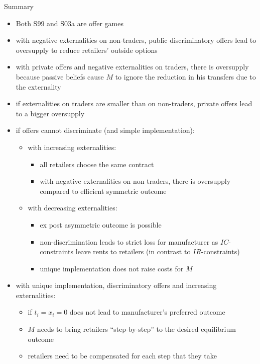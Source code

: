 \documentclass[11pt,english]{beamer}
\begin{document}
\begin{frame}[allowframebreaks]{Summary}
  \begin{itemize}
  \item Both S99 and S03a are offer games
  \item with negative externalities on non-traders, public
    discriminatory offers lead to oversupply to reduce retailers'
    outside options
  \item with private offers and negative externalities on traders,
    there is oversupply because passive beliefs cause $M$ to ignore
    the reduction in his transfers due to the externality
  \item if externalities on traders are smaller than on non-traders,
    private offers lead to a bigger oversupply
  \item if offers cannot discriminate (and simple implementation):
    \begin{itemize}
    \item with increasing externalities:
      \begin{itemize}
      \item all retailers choose the same contract
      \item with negative externalities on non-traders, there is
        oversupply compared to efficient symmetric outcome
      \end{itemize}
    \item with decreasing externalities:
      \begin{itemize}
      \item ex post asymmetric outcome is possible
      \item non-discrimination leads to strict loss for manufacturer
        as $IC$-constraints leave rents to retailers (in contrast to
        $IR$-constraints)
      \item unique implementation does not raise costs for $M$
      \end{itemize}
    \end{itemize}
  \item with unique implementation, discriminatory offers and
    increasing externalities:
    \begin{itemize}
    \item if $t_i=x_i =0$ does not lead to manufacturer's preferred outcome
    \item $M$ needs to bring retailers ``step-by-step'' to the desired
      equilibrium outcome
    \item retailers need to be compensated for each step that they take
    \end{itemize}
  \end{itemize}
\end{frame}
\end{document}
